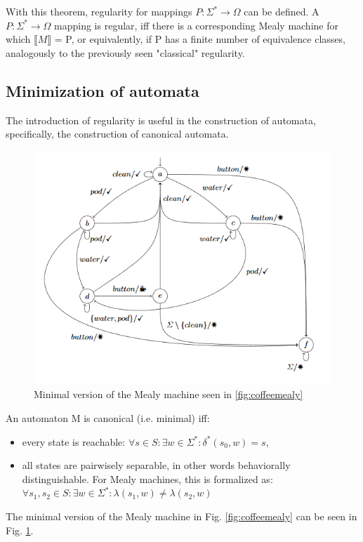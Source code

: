 With this theorem, regularity for mappings $P:\Sigma^*\to\Omega$ can be defined. A $P:\Sigma^*\to\Omega$ mapping is regular, iff there is a corresponding Mealy machine for which $\llbracket M\rrbracket$ = P, or equivalently, if P has a finite number of equivalence classes, analogously to the previously seen "classical" regularity.

\subsection{Minimization of automata}

The introduction of regularity is useful in the construction of automata, specifically, the construction of canonical automata. 


\begin{figure}
	\centering
	\includegraphics[width=0.7\linewidth]{include/coffeemealyminimal}
	\caption{Minimal version of the Mealy machine seen in \ref{fig:coffeemealy}}
	\label{fig:coffeemealyminimal}
\end{figure}


\begin{definition}
	An automaton M is canonical (i.e. minimal) iff:
	\begin{itemize}
		\item every state is reachable: $\forall s\in S: \exists w\in\Sigma^*: \delta^*(s_0, w) = s$,
		\item all states are pairwisely separable, in other words behaviorally distinguishable. For Mealy machines, this is formalized as: $\forall s_1, s_2\in S: \exists w\in\Sigma^*: \lambda(s_1, w)\neq\lambda(s_2, w)$
	\end{itemize}
\end{definition}

The minimal version of the Mealy machine in Fig. \ref{fig:coffeemealy} can be seen in Fig. \ref{fig:coffeemealyminimal}.


